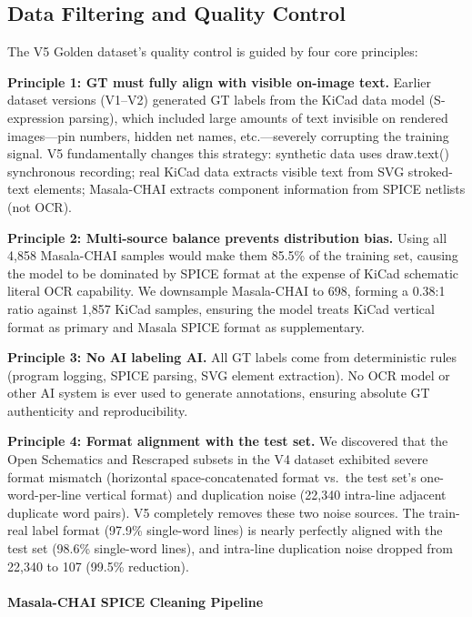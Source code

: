\subsection{Data Filtering and Quality Control}

The V5 Golden dataset's quality control is guided by four core principles:

\textbf{Principle 1: GT must fully align with visible on-image text.} Earlier dataset versions (V1--V2) generated GT labels from the KiCad data model (S-expression parsing), which included large amounts of text invisible on rendered images---pin numbers, hidden net names, etc.---severely corrupting the training signal. V5 fundamentally changes this strategy: synthetic data uses draw.text() synchronous recording; real KiCad data extracts visible text from SVG stroked-text elements; Masala-CHAI extracts component information from SPICE netlists (not OCR).

\textbf{Principle 2: Multi-source balance prevents distribution bias.} Using all 4,858 Masala-CHAI samples would make them 85.5\% of the training set, causing the model to be dominated by SPICE format at the expense of KiCad schematic literal OCR capability. We downsample Masala-CHAI to 698, forming a 0.38:1 ratio against 1,857 KiCad samples, ensuring the model treats KiCad vertical format as primary and Masala SPICE format as supplementary.

\textbf{Principle 3: No AI labeling AI.} All GT labels come from deterministic rules (program logging, SPICE parsing, SVG element extraction). No OCR model or other AI system is ever used to generate annotations, ensuring absolute GT authenticity and reproducibility.

\textbf{Principle 4: Format alignment with the test set.} We discovered that the Open Schematics and Rescraped subsets in the V4 dataset exhibited severe format mismatch (horizontal space-concatenated format vs.\ the test set's one-word-per-line vertical format) and duplication noise (22,340 intra-line adjacent duplicate word pairs). V5 completely removes these two noise sources. The train-real label format (97.9\% single-word lines) is nearly perfectly aligned with the test set (98.6\% single-word lines), and intra-line duplication noise dropped from 22,340 to 107 (99.5\% reduction).

\paragraph{Masala-CHAI SPICE Cleaning Pipeline}

